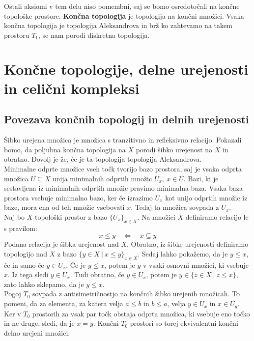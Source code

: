 \documentclass[a4paper, 12pt]{book}
\theoremstyle{definition}
\theoremstyle{remark}
\begin{document}
Ostali aksiomi v tem delu niso pomembni, saj se bomo osredotočali na končne
topološke prostore. \textbf{Končna topologija} je topologija na končni množici. Vsaka končna
topologija je topologija Aleksandrova in brž ko zahtevamo na takem prostoru
$T_1$, se nam porodi diskretna topologija.

\chapter{Končne topologije, delne urejenosti in celični kompleksi}
\section{Povezava končnih topologij in delnih urejenosti}\label{poset-top}
Šibko urejena množica je množica s tranzitivno in refleksivno relacijo.
Pokazali bomo, da poljubna končna topologija na $X$ porodi šibko urejenost na $X$ in obratno.
Dovolj je že, če je ta topologija topologija Aleksandrova.\\
Minimalne odprte množice vseh točk tvorijo bazo prostora,
saj je vsaka odprta množica $U \subseteq X$ unija minimalnih odprtih množic $U_x,\ x\in U$.
Bazi, ki je sestavljena iz minimalnih odprtih množic pravimo minimalna baza.
Vsaka baza prostora vsebuje minimalno bazo,
ker če izrazimo $U_x$ kot unijo odprtih množic iz baze, mora ena od teh množic
vsebovati $x$. Tedaj ta množica sovpada z $U_x$.\\
Naj bo $X$ topološki prostor z bazo $\{U_x\}_{x \in X}$. Na množici $X$ definiramo
relacijo le s pravilom:
\[x \leq y\quad \Longleftrightarrow\quad x \subseteq y\]
Podana relacija je šibka urejenost nad $X$. Obratno, iz šibke urejenosti
definiramo topologijo nad $X$ z bazo $\{y \in X\ |\ x \leq y\}_{x \in X}$.
Sedaj lahko pokažemo, da je $y \leq x$, če in samo če $y \in U_x$.
Če je $y \leq x$, potem je $y$ v vsaki osnovni množici, ki vsebuje $x$. Iz tega sledi $y \in U_x$.
Tudi obratno, če $y \in U_x$, potem je $y \in \{z \in X\ |\ z \leq x\}$, zato lahko sklepamo, da je $y \leq x$.\\
Pogoj $T_0$ sovpada z antisimetričnostjo na končnih šibko urejenih množicah.
To pomeni, da za elementa, za katera velja $a \leq b$ in $b \leq a$, velja $y \in U_x$ in $x \in U_y$.
Ker v $T_0$ prostorih za vsak par točk obstaja odprta množica,
ki vsebuje eno točko in ne druge, sledi, da je $x = y$. Končni $T_0$ prostori so
torej ekvivalentni končni delno urejeni množici.\\
\end{document}
